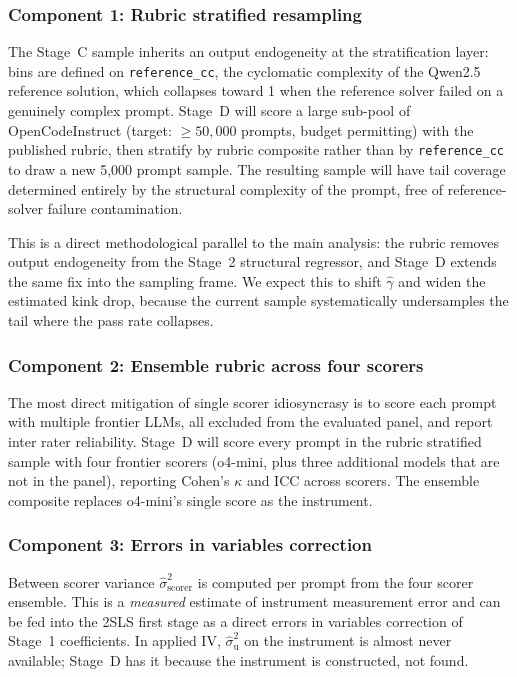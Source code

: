 \documentclass[conference]{IEEEtran}
\begin{document}
\subsubsection{Component 1: Rubric stratified resampling}
The Stage~C sample inherits an output endogeneity at the stratification layer: bins are defined on \texttt{reference\_cc}, the cyclomatic complexity of the Qwen2.5 reference solution, which collapses toward 1 when the reference solver failed on a genuinely complex prompt. Stage~D will score a large sub-pool of OpenCodeInstruct (target: $\geq 50{,}000$ prompts, budget permitting) with the published rubric, then stratify by rubric composite rather than by \texttt{reference\_cc} to draw a new 5{,}000 prompt sample. The resulting sample will have tail coverage determined entirely by the structural complexity of the prompt, free of reference-solver failure contamination.

This is a direct methodological parallel to the main analysis: the rubric removes output endogeneity from the Stage~2 structural regressor, and Stage~D extends the same fix into the sampling frame. We expect this to shift $\hat{\gamma}$ and widen the estimated kink drop, because the current sample systematically undersamples the tail where the pass rate collapses.

\subsubsection{Component 2: Ensemble rubric across four scorers}
The most direct mitigation of single scorer idiosyncrasy is to score each prompt with multiple frontier LLMs, all excluded from the evaluated panel, and report inter rater reliability. Stage~D will score every prompt in the rubric stratified sample with four frontier scorers (o4-mini, plus three additional models that are not in the panel), reporting Cohen's $\kappa$ and ICC across scorers. The ensemble composite replaces o4-mini's single score as the instrument.

\subsubsection{Component 3: Errors in variables correction}
Between scorer variance $\hat{\sigma}^2_{\text{scorer}}$ is computed per prompt from the four scorer ensemble. This is a \emph{measured} estimate of instrument measurement error and can be fed into the 2SLS first stage as a direct errors in variables correction of Stage~1 coefficients. In applied IV, $\hat{\sigma}^2_{\text{u}}$ on the instrument is almost never available; Stage~D has it because the instrument is constructed, not found.
\end{document}
